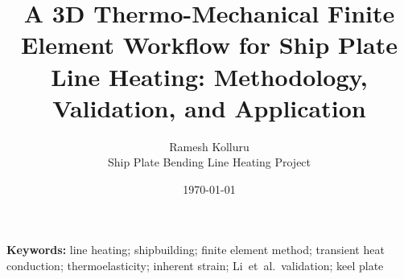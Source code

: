 \documentclass[11pt,a4paper]{article}
\title{A 3D Thermo-Mechanical Finite Element Workflow for Ship Plate Line Heating: Methodology, Validation, and Application}
\author{Ramesh Kolluru\\
  \normalsize Ship Plate Bending Line Heating Project}
\date{\today}
\begin{document}
\maketitle



\noindent\textbf{Keywords:} line heating; shipbuilding; finite element method; transient heat conduction; thermoelasticity; inherent strain; Li~et~al.\ validation; keel plate

\tableofcontents
\newpage











\appendix

\end{document}
